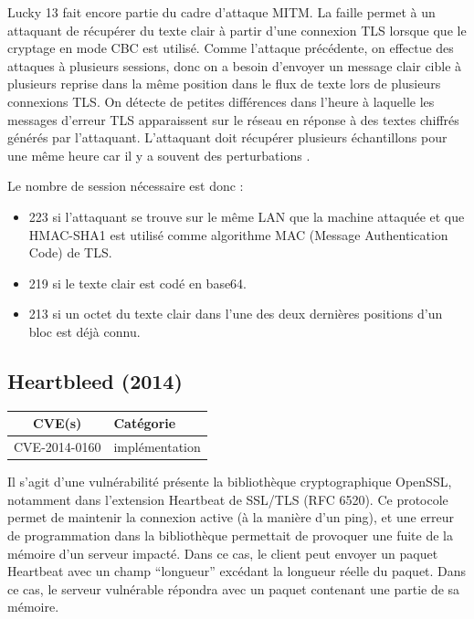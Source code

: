 \vspace{1em}

Lucky 13 fait encore partie du cadre d'attaque MITM. La faille permet à un attaquant de récupérer du texte clair à partir d'une connexion TLS lorsque que le cryptage en mode CBC est utilisé. Comme l'attaque précédente, on effectue des attaques à plusieurs sessions, donc on a besoin d'envoyer un message clair cible à plusieurs reprise dans la même position dans le flux de texte lors de plusieurs connexions TLS. On détecte de petites différences dans l'heure à laquelle les messages d'erreur TLS apparaissent sur le réseau en réponse à des textes chiffrés générés par l'attaquant. L'attaquant doit récupérer plusieurs échantillons pour une même heure car il y a souvent des perturbations \cite{lucky13}.

Le nombre de session nécessaire est donc :

\begin{itemize}
\item 223 si l'attaquant se trouve sur le même LAN que la machine attaquée et que HMAC-SHA1 est utilisé comme algorithme MAC (Message Authentication Code) de TLS.
\item 219 si le texte clair est codé en base64.
\item 213 si un octet du texte clair dans l'une des deux dernières positions d'un bloc est déjà connu.
\end{itemize}




\subsection{Heartbleed (2014)}

\begin{tabularx}{0.96\textwidth}{|c|X|}
  \hline
  \textbf{CVE(s)} & \textbf{Catégorie} \\
  \hline
  CVE-2014-0160 & implémentation \\
  \hline
\end{tabularx}

\vspace{1em}

Il s'agit d'une vulnérabilité présente la bibliothèque cryptographique OpenSSL, notamment dans l'extension Heartbeat de SSL/TLS (RFC 6520). Ce protocole permet de maintenir la connexion active (à la manière d'un ping), et une erreur de programmation dans la bibliothèque permettait de provoquer une fuite de la mémoire d'un serveur impacté. Dans ce cas, le client peut envoyer un paquet Heartbeat avec un champ ``longueur'' excédant la longueur réelle du paquet. Dans ce cas, le serveur vulnérable répondra avec un paquet contenant une partie de sa mémoire.

